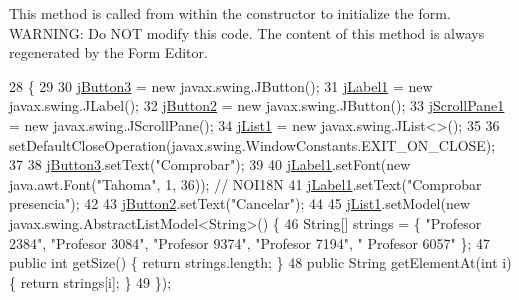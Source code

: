 This method is called from within the constructor to initialize the form. W\+A\+R\+N\+I\+NG\+: Do N\+OT modify this code. The content of this method is always regenerated by the Form Editor. 
\begin{DoxyCode}
28                                   \{
29 
30         \mbox{\hyperlink{classinterfacessoguar_1_1cu17_a5df410d0f4d1de0038eed02645f3c824}{jButton3}} = \textcolor{keyword}{new} javax.swing.JButton();
31         \mbox{\hyperlink{classinterfacessoguar_1_1cu17_aa880b94b17154b9daee38aa63d559425}{jLabel1}} = \textcolor{keyword}{new} javax.swing.JLabel();
32         \mbox{\hyperlink{classinterfacessoguar_1_1cu17_ab0ec1e2337c482ba36b861315213b157}{jButton2}} = \textcolor{keyword}{new} javax.swing.JButton();
33         \mbox{\hyperlink{classinterfacessoguar_1_1cu17_a02bf07a587e2b0c668b21a616369e5cb}{jScrollPane1}} = \textcolor{keyword}{new} javax.swing.JScrollPane();
34         \mbox{\hyperlink{classinterfacessoguar_1_1cu17_a524c114f85a8d7a1c8df04d268ca95c9}{jList1}} = \textcolor{keyword}{new} javax.swing.JList<>();
35 
36         setDefaultCloseOperation(javax.swing.WindowConstants.EXIT\_ON\_CLOSE);
37 
38         \mbox{\hyperlink{classinterfacessoguar_1_1cu17_a5df410d0f4d1de0038eed02645f3c824}{jButton3}}.setText(\textcolor{stringliteral}{"Comprobar"});
39 
40         \mbox{\hyperlink{classinterfacessoguar_1_1cu17_aa880b94b17154b9daee38aa63d559425}{jLabel1}}.setFont(\textcolor{keyword}{new} java.awt.Font(\textcolor{stringliteral}{"Tahoma"}, 1, 36)); \textcolor{comment}{// NOI18N}
41         \mbox{\hyperlink{classinterfacessoguar_1_1cu17_aa880b94b17154b9daee38aa63d559425}{jLabel1}}.setText(\textcolor{stringliteral}{"Comprobar presencia"});
42 
43         \mbox{\hyperlink{classinterfacessoguar_1_1cu17_ab0ec1e2337c482ba36b861315213b157}{jButton2}}.setText(\textcolor{stringliteral}{"Cancelar"});
44 
45         \mbox{\hyperlink{classinterfacessoguar_1_1cu17_a524c114f85a8d7a1c8df04d268ca95c9}{jList1}}.setModel(\textcolor{keyword}{new} javax.swing.AbstractListModel<String>() \{
46             String[] strings = \{ \textcolor{stringliteral}{"Profesor 2384"}, \textcolor{stringliteral}{"Profesor 3084"}, \textcolor{stringliteral}{"Profesor 9374"}, \textcolor{stringliteral}{"Profesor 7194"}, \textcolor{stringliteral}{"
      Profesor 6057"} \};
47             \textcolor{keyword}{public} \textcolor{keywordtype}{int} getSize() \{ \textcolor{keywordflow}{return} strings.length; \}
48             \textcolor{keyword}{public} String getElementAt(\textcolor{keywordtype}{int} i) \{ \textcolor{keywordflow}{return} strings[i]; \}
49         \});

\end{DoxyCode}
